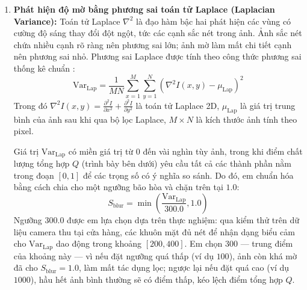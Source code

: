 \begin{enumerate}
    \item \textbf{Phát hiện độ mờ bằng phương sai toán tử Laplace (Laplacian Variance):} Toán tử Laplace $\nabla^2$ là đạo hàm bậc hai phát hiện các vùng có cường độ sáng thay đổi đột ngột, tức các cạnh sắc nét trong ảnh. Ảnh sắc nét chứa nhiều cạnh rõ ràng nên phương sai lớn; ảnh mờ làm mất chi tiết cạnh nên phương sai nhỏ. Phương sai Laplace được tính theo công thức phương sai thống kê chuẩn \cite{gonzalez2018digital}:
    \begin{equation}
    \text{Var}_{\text{Lap}} = \frac{1}{M N} \sum_{x=1}^{M} \sum_{y=1}^{N} \left( \nabla^2 I(x, y) - \mu_{\text{Lap}} \right)^2
    \end{equation}
    Trong đó $\nabla^2 I(x, y) = \frac{\partial^2 I}{\partial x^2} + \frac{\partial^2 I}{\partial y^2}$ là toán tử Laplace 2D, $\mu_{\text{Lap}}$ là giá trị trung bình của ảnh sau khi qua bộ lọc Laplace, $M \times N$ là kích thước ảnh tính theo pixel.

    Giá trị $\text{Var}_{\text{Lap}}$ có miền giá trị từ $0$ đến vài nghìn tùy ảnh, trong khi điểm chất lượng tổng hợp $Q$ (trình bày bên dưới) yêu cầu tất cả các thành phần nằm trong đoạn $[0, 1]$ để các trọng số có ý nghĩa so sánh. Do đó, em chuẩn hóa bằng cách chia cho một ngưỡng bão hòa và chặn trên tại $1.0$:
    \begin{equation}
    S_{\text{blur}} = \min \left( \frac{\text{Var}_{\text{Lap}}}{300.0}, 1.0 \right)
    \end{equation}
    Ngưỡng $300.0$ được em lựa chọn dựa trên thực nghiệm: qua kiểm thử trên dữ liệu camera thu tại cửa hàng, các khuôn mặt đủ nét để nhận dạng biểu cảm cho $\text{Var}_{\text{Lap}}$ dao động trong khoảng $[200, 400]$. Em chọn $300$ --- trung điểm của khoảng này --- vì nếu đặt ngưỡng quá thấp (ví dụ $100$), ảnh còn khá mờ đã cho $S_{\text{blur}} = 1.0$, làm mất tác dụng lọc; ngược lại nếu đặt quá cao (ví dụ $1000$), hầu hết ảnh bình thường sẽ có điểm thấp, kéo lệch điểm tổng hợp $Q$.


\end{enumerate}
